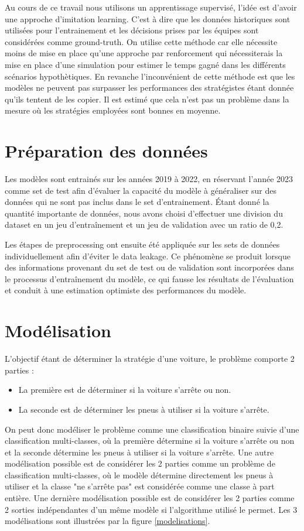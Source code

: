 Au cours de ce travail nous utilisons un apprentissage supervisé, l'idée est d'avoir une approche d'imitation learning.
C'est à dire que les données historiques sont utilisées pour l'entrainement et les décisions prises par les équipes sont considérées comme ground-truth.
On utilise cette méthode car elle nécessite moins de mise en place qu'une approche par renforcement qui nécessiterais la mise en place d'une simulation
pour estimer le temps gagné dans les différents scénarios hypothètiques.
En revanche l'inconvénient de cette méthode est que les modèles ne peuvent pas surpasser les performances des stratégistes étant donnée qu'ils tentent de les copier.
Il est estimé que cela n'est pas un problème dans la mesure où les stratégies employées sont bonnes en moyenne.

\section{Préparation des données}
Les modèles sont entrainés sur les années 2019 à 2022, en réservant l'année 2023 comme set de test afin d'évaluer la capacité du modèle à généraliser
sur des données qui ne sont pas inclus dans le set d'entrainement.
Étant donné la quantité importante de données, nous avons choisi d'effectuer une division du dataset en un jeu d'entraînement et un jeu de validation avec un ratio de 0,2.

Les étapes de preprocessing ont ensuite été appliquée sur les sets de données individuellement afin d'éviter le data leakage.
Ce phénomène se produit lorsque des informations provenant du set de test ou de validation sont incorporées dans le processus d'entraînement du modèle,
ce qui fausse les résultats de l'évaluation et conduit à une estimation optimiste des performances du modèle.

\section{Modélisation}
L'objectif étant de déterminer la stratégie d'une voiture, le problème comporte 2 parties :
\begin{itemize}
    \item La première est de déterminer si la voiture s'arrête ou non.
    \item La seconde est de déterminer les pneus à utiliser si la voiture s'arrête.
\end{itemize}
On peut donc modéliser le problème comme une classification binaire suivie d'une classification multi-classes,
où la première détermine si la voiture s'arrête ou non et la seconde détermine les pneus à utiliser si la voiture s'arrête.
Une autre modélisation possible est de considérer les 2 parties comme un problème de classification multi-classes,
où le modèle détermine directement les pneus à utiliser et la classe "ne s'arrête pas" est considérée comme une classe à part entière.
Une dernière modélisation possible est de considérer les 2 parties comme 2 sorties indépendantes d'un même modèle si l'algorithme utilisé le permet.
Les 3 modélisations sont illustrées par la figure \ref{modelisations}.


